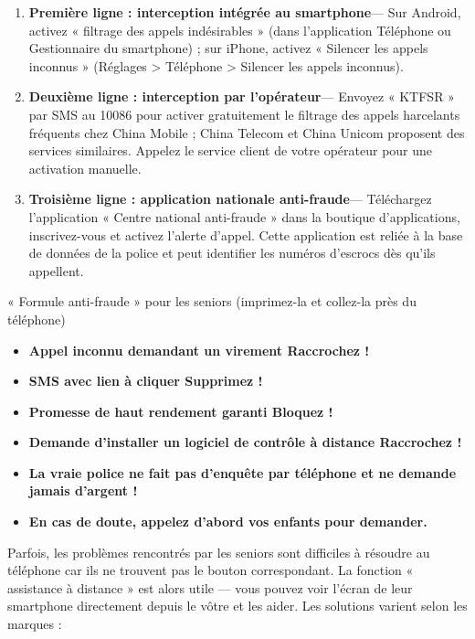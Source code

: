 
\begin{enumerate}
  \item \textbf{Première ligne : interception intégrée au smartphone}— Sur Android, activez « filtrage des appels indésirables » (dans l'application Téléphone ou Gestionnaire du smartphone) ; sur iPhone, activez « Silencer les appels inconnus » (Réglages > Téléphone > Silencer les appels inconnus).
  \item \textbf{Deuxième ligne : interception par l'opérateur}— Envoyez « KTFSR » par SMS au 10086 pour activer gratuitement le filtrage des appels harcelants fréquents chez China Mobile ; China Telecom et China Unicom proposent des services similaires. Appelez le service client de votre opérateur pour une activation manuelle.
  \item \textbf{Troisième ligne : application nationale anti-fraude}— Téléchargez l'application « Centre national anti-fraude » dans la boutique d'applications, inscrivez-vous et activez l'alerte d'appel. Cette application est reliée à la base de données de la police et peut identifier les numéros d'escrocs dès qu'ils appellent.
\end{enumerate}

\begin{tcbwarn}{« Formule anti-fraude » pour les seniors (imprimez-la et collez-la près du téléphone)}
\begin{itemize}
  \item \textbf{Appel inconnu demandant un virement Raccrochez !}
  \item \textbf{SMS avec lien à cliquer Supprimez !}
  \item \textbf{Promesse de haut rendement garanti Bloquez !}
  \item \textbf{Demande d'installer un logiciel de contrôle à distance Raccrochez !}
  \item \textbf{La vraie police ne fait pas d'enquête par téléphone et ne demande jamais d'argent !}
  \item \textbf{En cas de doute, appelez d'abord vos enfants pour demander.}
\end{itemize}

\end{tcbwarn}


Parfois, les problèmes rencontrés par les seniors sont difficiles à résoudre au téléphone car ils ne trouvent pas le bouton correspondant. La fonction « assistance à distance » est alors utile — vous pouvez voir l'écran de leur smartphone directement depuis le vôtre et les aider. Les solutions varient selon les marques :

